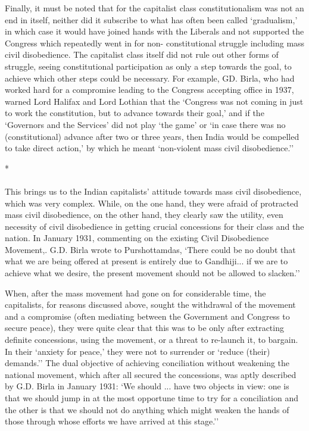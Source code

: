 Finally, it must be noted that for the capitalist class constitutionalism was not an end in itself, neither did it subscribe to what has often been called `gradualism,' in which case it would have joined hands with the Liberals and not supported the Congress which repeatedly went in for non- constitutional struggle including mass civil disobedience. The capitalist class itself did not rule out other forms of struggle, seeing constitutional participation as only a step towards the goal, to achieve which other steps could be necessary. For example, GD. Birla, who had worked hard for a compromise leading to the Congress accepting office in 1937, warned Lord Halifax and Lord Lothian that the `Congress was not coming in just to work the constitution, but to advance towards their goal,' and if the `Governors and the Services' did not play `the game' or `in case there was no (constitutional) advance after two or three years, then India would be compelled to take direct action,' by which he meant `non-violent mass civil disobedience.''

\begin{center}*\end{center}

\paragraph*{}

This brings us to the Indian capitalists' attitude towards mass civil disobedience, which was very complex. While, on the one hand, they were afraid of protracted mass civil disobedience, on the other hand, they clearly saw the utility, even necessity of civil disobedience in getting crucial concessions for their class and the nation. In January 1931, commenting on the existing Civil Disobedience Movement,. G.D. Birla wrote to Purshottamdas, `There could be no doubt that what we are being offered at present is entirely due to Gandhiji... if we are to achieve what we desire, the present movement should not be allowed to slacken.'' 

When, after the mass movement had gone on for considerable time, the capitalists, for reasons discussed above, sought the withdrawal of the movement and a compromise (often mediating between the Government and Congress to secure peace), they were quite clear that this was to be only after extracting definite concessions, using the movement, or a threat to re-launch it, to bargain. In their `anxiety for peace,' they were not to surrender or `reduce (their) demands.'' The dual objective of achieving conciliation without weakening the national movement, which after all secured the concessions, was aptly described by G.D. Birla in January 1931: `We should ... have two objects in view: one is that we should jump in at the most opportune time to try for a conciliation and the other is that we should not do anything which might weaken the hands of those through whose efforts we have arrived at this stage.'' 

